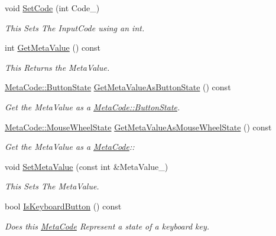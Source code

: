 \begin{DoxyCompactItemize}
void \hyperlink{classphys_1_1MetaCode_a26dd1a0b3b099b080fade8e33e9dde70}{SetCode} (int Code\_\-)
\begin{DoxyCompactList}\small\item\em This Sets The InputCode using an int. \item\end{DoxyCompactList}\item 
int \hyperlink{classphys_1_1MetaCode_ad8e7e4e7c6cdc6a05b8522910ce90cd4}{GetMetaValue} () const 
\begin{DoxyCompactList}\small\item\em This Returns the MetaValue. \item\end{DoxyCompactList}\item 
\hyperlink{classphys_1_1MetaCode_a2fdfb26b3e50ceb0ccc60bfc4c3d6ac2}{MetaCode::ButtonState} \hyperlink{classphys_1_1MetaCode_a4f8da25e905ac23d935e343ec6d7e695}{GetMetaValueAsButtonState} () const 
\begin{DoxyCompactList}\small\item\em Get the MetaValue as a \hyperlink{classphys_1_1MetaCode_a2fdfb26b3e50ceb0ccc60bfc4c3d6ac2}{MetaCode::ButtonState}. \item\end{DoxyCompactList}\item 
\hyperlink{classphys_1_1MetaCode_af9ba277d1ef071be8861e35c2b7d82d6}{MetaCode::MouseWheelState} \hyperlink{classphys_1_1MetaCode_a63e4ca3a68ae5a37ce7d35750b86d0cf}{GetMetaValueAsMouseWheelState} () const 
\begin{DoxyCompactList}\small\item\em Get the MetaValue as a \hyperlink{classphys_1_1MetaCode}{MetaCode}:: \item\end{DoxyCompactList}\item 
void \hyperlink{classphys_1_1MetaCode_a31a6390626b08c1bbf08e3f68d2ea764}{SetMetaValue} (const int \&MetaValue\_\-)
\begin{DoxyCompactList}\small\item\em This Sets The MetaValue. \item\end{DoxyCompactList}\item 
bool \hyperlink{classphys_1_1MetaCode_ad86e1599eccea8edecb721eb84c06c72}{IsKeyboardButton} () const 
\begin{DoxyCompactList}\small\item\em Does this \hyperlink{classphys_1_1MetaCode}{MetaCode} Represent a state of a keyboard key. \item\end{DoxyCompactList}\item 

\end{DoxyCompactItemize}
